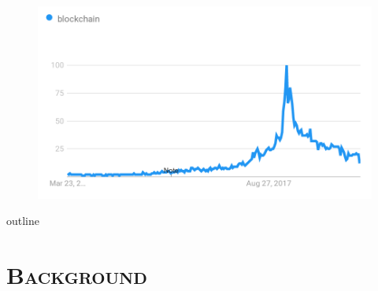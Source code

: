 \documentclass[xcolor=x11names,compress]{beamer}
\renewcommand{\(}{\begin{columns}}
\renewcommand{\)}{\end{columns}}
\newcommand{\<}[1]{\begin{column}{#1}}
\renewcommand{\>}{\end{column}}
\begin{document}
\begin{frame}
    \begin{figure}
        \includegraphics[scale=0.3]{./images/trends}
    \end{figure}
\end{frame}

\begin{frame}{outline}
    \tableofcontents
\end{frame}

\section{\scshape Background}
\end{document}

